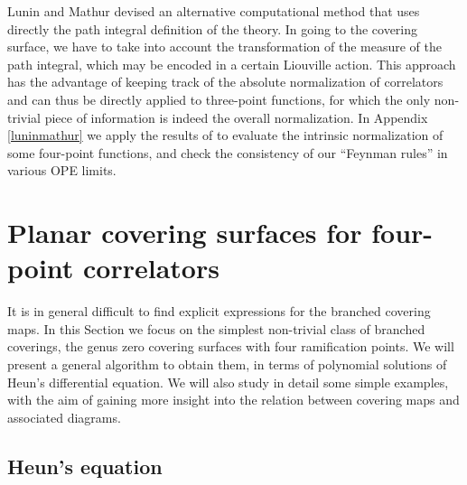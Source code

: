\documentclass[letterpaper]{JHEP3}
\begin{document}
Lunin and Mathur \cite{Lunin:2000yv} devised an alternative computational method that uses
 directly   the path integral definition of the theory. In going to the covering surface, we have to take  into account the transformation
of the measure of the path integral, which may be encoded in a certain  Liouville action.
This approach has the advantage of keeping track of  the absolute normalization of correlators and can
thus be directly applied to three-point functions, for which  the only
non-trivial piece of information is indeed the overall normalization. 
  In Appendix \ref{luninmathur} we  apply the results of \cite{Lunin:2000yv}
 to evaluate the intrinsic normalization of some four-point functions, and check the consistency of  our
 ``Feynman rules''  in various OPE limits.





\section{Planar covering surfaces for four-point correlators}

It is in general difficult to find explicit expressions for the branched covering maps. In this Section we focus on the simplest non-trivial class of branched coverings, 
the genus zero covering surfaces with four ramification points.
We will present a general algorithm to obtain them, in terms of polynomial solutions of Heun's differential equation.
We will also study in detail some simple examples, with the aim of gaining more insight into the relation
between covering maps and associated diagrams.



\subsection{Heun's equation}\label{heunsec}
\end{document}
